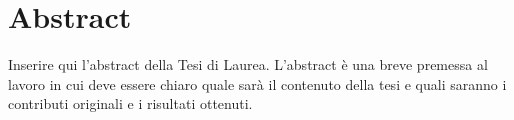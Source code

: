 \chapter*{Abstract}

\label{ref:abstract}

Inserire qui l'abstract della Tesi di Laurea. L'abstract
è una breve premessa al lavoro in
cui deve essere chiaro quale sarà il contenuto della tesi e quali saranno
i contributi originali e i risultati ottenuti.

